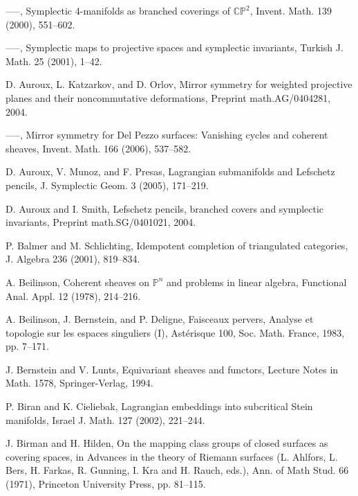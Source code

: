 \begin{list}{}{\setlength{\leftmargin}{3em}\setlength{\labelwidth}{2.5em}\setlength{\itemsep}{.5em}\small}
\item[\hypertarget{bib:12}{[12]}] —–, Symplectic 4-manifolds as branched coverings of $\mathbb{CP}^2$, Invent. Math. 139 (2000), 551–602. 
\item[\hypertarget{bib:13}{[13]}] —–, Symplectic maps to projective spaces and symplectic invariants, Turkish J. Math. 25 (2001), 1–42. 
\item[\hypertarget{bib:14}{[14]}] D. Auroux, L. Katzarkov, and D. Orlov, Mirror symmetry for weighted projective planes and their noncommutative deformations, Preprint math.AG/0404281, 2004. 
\item[\hypertarget{bib:15}{[15]}] —–, Mirror symmetry for Del Pezzo surfaces: Vanishing cycles and coherent sheaves, Invent. Math. 166 (2006), 537–582. 
\item[\hypertarget{bib:16}{[16]}] D. Auroux, V. Munoz, and F. Presas, Lagrangian submanifolds and Lefschetz pencils, J. Symplectic Geom. 3 (2005), 171–219. 
\item[\hypertarget{bib:17}{[17]}] D. Auroux and I. Smith, Lefschetz pencils, branched covers and symplectic invariants, Preprint math.SG/0401021, 2004. 
\item[\hypertarget{bib:18}{[18]}] P. Balmer and M. Schlichting, Idempotent completion of triangulated categories, J. Algebra 236 (2001), 819–834. 
\item[\hypertarget{bib:19}{[19]}] A. Beilinson, Coherent sheaves on $\mathbb{P}^n$ and problems in linear algebra, Functional Anal. Appl. 12 (1978), 214–216. 
\item[\hypertarget{bib:20}{[20]}] A. Beilinson, J. Bernstein, and P. Deligne, Faisceaux pervers, Analyse et topologie sur les espaces singuliers (I), Astérisque 100, Soc. Math. France, 1983, pp. 7–171. 
\item[\hypertarget{bib:21}{[21]}] J. Bernstein and V. Lunts, Equivariant sheaves and functors, Lecture Notes in Math. 1578, Springer-Verlag, 1994. 
\item[\hypertarget{bib:22}{[22]}] P. Biran and K. Cieliebak, Lagrangian embeddings into subcritical Stein manifolds, Israel J. Math. 127 (2002), 221–244. 
\item[\hypertarget{bib:23}{[23]}] J. Birman and H. Hilden, On the mapping class groups of closed surfaces as covering spaces, in Advances in the theory of Riemann surfaces (L. Ahlfors, L. Bers, H. Farkas, R. Gunning, I. Kra and H. Rauch, eds.), Ann. of Math Stud. 66 (1971), Princeton University Press, pp. 81–115. 

\end{list}

